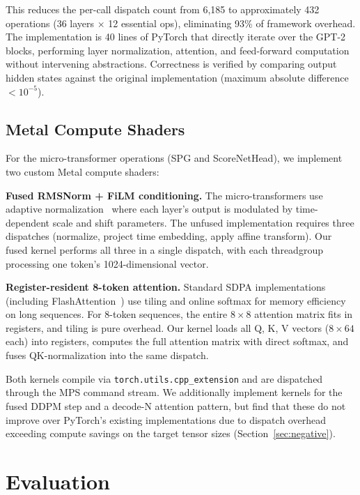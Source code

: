 \documentclass[sigconf,authordraft]{acmart}
\begin{document}
This reduces the per-call dispatch count from 6{,}185 to approximately 432 operations (36 layers $\times$ 12 essential ops), eliminating 93\% of framework overhead. The implementation is 40 lines of PyTorch that directly iterate over the GPT-2 blocks, performing layer normalization, attention, and feed-forward computation without intervening abstractions. Correctness is verified by comparing output hidden states against the original implementation (maximum absolute difference $< 10^{-5}$).

\subsection{Metal Compute Shaders}

For the micro-transformer operations (SPG and ScoreNetHead), we implement two custom Metal compute shaders:

\textbf{Fused RMSNorm + FiLM conditioning.} The micro-transformers use adaptive normalization~\cite{perez2018film} where each layer's output is modulated by time-dependent scale and shift parameters. The unfused implementation requires three dispatches (normalize, project time embedding, apply affine transform). Our fused kernel performs all three in a single dispatch, with each threadgroup processing one token's 1024-dimensional vector.

\textbf{Register-resident 8-token attention.} Standard SDPA implementations (including FlashAttention~\cite{dao2022flashattention,dao2024flashattention2}) use tiling and online softmax for memory efficiency on long sequences. For 8-token sequences, the entire $8 \times 8$ attention matrix fits in registers, and tiling is pure overhead. Our kernel loads all Q, K, V vectors ($8 \times 64$ each) into registers, computes the full attention matrix with direct softmax, and fuses QK-normalization into the same dispatch.

Both kernels compile via \texttt{torch.utils.cpp\_extension} and are dispatched through the MPS command stream. We additionally implement kernels for the fused DDPM step and a decode-N attention pattern, but find that these do not improve over PyTorch's existing implementations due to dispatch overhead exceeding compute savings on the target tensor sizes (Section~\ref{sec:negative}).

\section{Evaluation}
\end{document}
